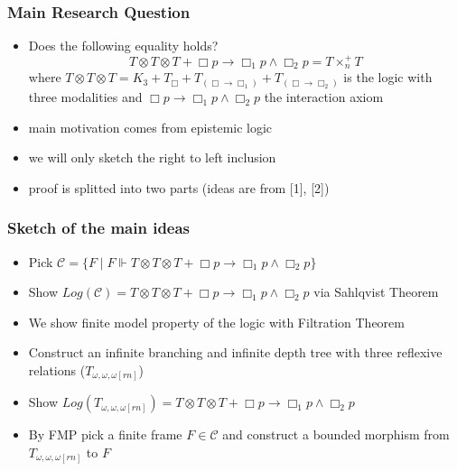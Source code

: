 \documentclass[hyperref={pdfpagelabels=false},t,10pt]{beamer}
\begin{document}
\begin{frame}
  \frametitle{Main Research Question}
  \begin{itemize}
    \item Does the following equality holds? 
    $$T \otimes T \otimes T + \Box p \rightarrow \Box_1 p \land \Box_2 p = T \times_n^+ T$$
    where $T \otimes T \otimes T = K_3 + T_{\Box} + T_{(\Box \rightarrow \Box_1)} + T_{(\Box \rightarrow \Box_2)}$ is the logic with three modalities 
    and $\Box p \rightarrow \Box_1 p \land \Box_2 p$ the interaction axiom \pause
    \item main motivation comes from epistemic logic 
    \item we will only sketch the right to left inclusion
    \item proof is splitted into two parts (ideas are from [1], [2])
  \end{itemize}
\end{frame}

\begin{frame}
  \frametitle{Sketch of the main ideas}
  \begin{itemize}
    \item Pick $\mathcal{C} = \{F \mid F \Vdash T \otimes T\otimes T + \Box p \rightarrow \Box_1 p \land \Box_2 p\}$  \pause
    \item Show $Log(\mathcal{C}) = T \otimes T \otimes T + \Box p \rightarrow \Box_1 p \land \Box_2 p$ via Sahlqvist Theorem
    \item We show finite model property of the logic with Filtration Theorem \pause
    \item Construct an infinite branching and infinite depth tree with three reflexive relations ($T_{\omega,\omega,\omega[rn]}$) \pause
    \item Show $Log(T_{\omega,\omega,\omega[rn]}) = T \otimes T \otimes T+ \Box p \rightarrow \Box_1 p \land \Box_2 p$
    \item By FMP pick a finite frame $F \in \mathcal{C}$ and construct a bounded morphism from $T_{\omega,\omega,\omega[rn]}$ to $F$
  \end{itemize}

\end{frame}
\end{document}
